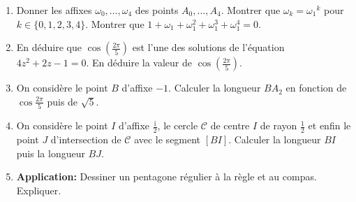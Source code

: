 \documentclass[11pt,a4paper]{article}
\theoremstyle{definition}
\newcommand{\noindication}{\stepcounter{ind}}
\newcommand{\ii}{\mathrm{i}}
\begin{document}
\begin{enumerate}
\item
Donner les affixes $\omega_{0},\ldots,\omega_{4}$ des points $A_{0},\ldots,A_{4}$. Montrer
que  $\omega_{k}={\omega_{1}}^k$ pour $ k\in\{0,1,2,3,4\}$. Montrer que
$1+\omega_{1}+\omega_{1}^2+\omega_{1}^3+\omega_{1}^4=0$.

\item
En d\'eduire que $\cos(\frac{2\pi}{5})$ est l'une des solutions de l'\'equation $4z^2+2z-1=0$.
En d\'eduire la valeur de $\cos(\frac{2\pi}{5})$.

\item
On consid\`ere le point $B$ d'affixe $-1$. Calculer la longueur $BA_{2}$ en fonction de
$\cos\frac{2\pi}{5}$ puis de $\sqrt{5}$.

\item
On consid\`ere le point $I$ d'affixe $\frac{\ii}{2}$, le cercle $\mathcal{C}$ de centre $I$ de
rayon $\frac{1}{2}$ et enfin le point $J$ d'intersection de $\mathcal{C}$ avec le segment
$[BI]$. Calculer la longueur $BI$ puis  la longueur $BJ$.

\item
\textbf{Application:} Dessiner un pentagone r\'egulier \`a la r\`egle et au compas. Expliquer.
\end{enumerate}




\finenonce 

\noindication
\end{document}
